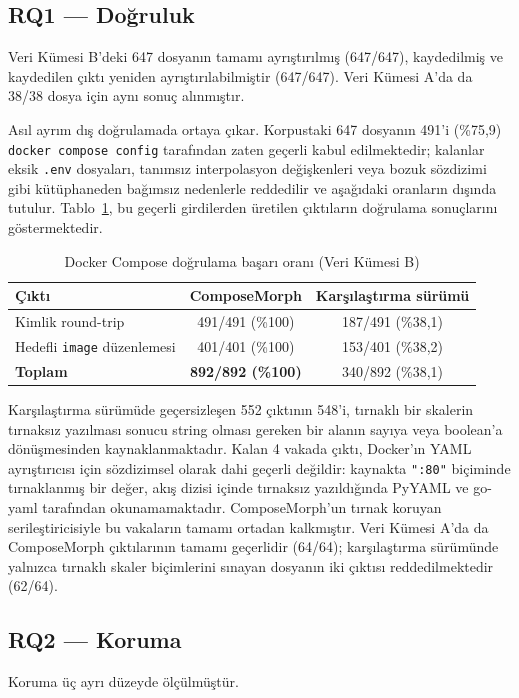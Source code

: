 \documentclass[conference]{IEEEtran}
\begin{document}
\subsection{RQ1 --- Doğruluk}
Veri Kümesi B'deki 647 dosyanın tamamı ayrıştırılmış (647/647), kaydedilmiş
ve kaydedilen çıktı yeniden ayrıştırılabilmiştir (647/647). Veri Kümesi
A'da da 38/38 dosya için aynı sonuç alınmıştır.

Asıl ayrım dış doğrulamada ortaya çıkar. Korpustaki 647 dosyanın 491'i
(\%75,9) \texttt{docker compose config} tarafından zaten geçerli kabul
edilmektedir; kalanlar eksik \texttt{.env} dosyaları, tanımsız
interpolasyon değişkenleri veya bozuk sözdizimi gibi kütüphaneden bağımsız
nedenlerle reddedilir ve aşağıdaki oranların dışında tutulur.
Tablo~\ref{tab:validation}, bu geçerli girdilerden üretilen çıktıların
doğrulama sonuçlarını göstermektedir.

\begin{table}[t]
\caption{Docker Compose doğrulama başarı oranı (Veri Kümesi B)}
\label{tab:validation}
\centering
\begin{tabular}{lcc}
\toprule
Çıktı & ComposeMorph & Karşılaştırma sürümü \\
\midrule
Kimlik round-trip & 491/491 (\%100) & 187/491 (\%38,1) \\
Hedefli \texttt{image} düzenlemesi & 401/401 (\%100) & 153/401 (\%38,2) \\
\midrule
\textbf{Toplam} & \textbf{892/892 (\%100)} & 340/892 (\%38,1) \\
\bottomrule
\end{tabular}
\end{table}

Karşılaştırma sürümüde geçersizleşen 552 çıktının 548'i, tırnaklı bir skalerin
tırnaksız yazılması sonucu string olması gereken bir alanın sayıya veya
boolean'a dönüşmesinden kaynaklanmaktadır. Kalan 4 vakada çıktı,
Docker'ın YAML ayrıştırıcısı için sözdizimsel olarak dahi geçerli
değildir: kaynakta \texttt{":80"} biçiminde tırnaklanmış bir değer, akış
dizisi içinde tırnaksız yazıldığında PyYAML ve go-yaml tarafından
okunamamaktadır. ComposeMorph'un tırnak koruyan serileştiricisiyle bu
vakaların tamamı ortadan kalkmıştır. Veri Kümesi A'da da ComposeMorph
çıktılarının tamamı geçerlidir (64/64); karşılaştırma sürümünde yalnızca tırnaklı
skaler biçimlerini sınayan dosyanın iki çıktısı reddedilmektedir (62/64).

\subsection{RQ2 --- Koruma}
Koruma üç ayrı düzeyde ölçülmüştür.
\end{document}
